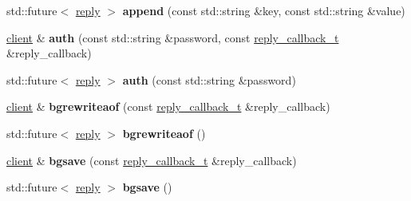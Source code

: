 \begin{DoxyCompactItemize}
\item 
\mbox{\label{classcpp__redis_1_1client_a3e50dddad0b4c9eca58d970bdc4e78da}} 
std\+::future$<$ \mbox{\hyperlink{classcpp__redis_1_1reply}{reply}} $>$ {\bfseries append} (const std\+::string \&key, const std\+::string \&value)
\item 
\mbox{\label{classcpp__redis_1_1client_a3ee834ca9c0810d2eafcf04de9dc0670}} 
\mbox{\hyperlink{classcpp__redis_1_1client}{client}} \& {\bfseries auth} (const std\+::string \&password, const \mbox{\hyperlink{classcpp__redis_1_1client_af7a65eb21aa25230bfbb0b0203c4fc04}{reply\+\_\+callback\+\_\+t}} \&reply\+\_\+callback)
\item 
\mbox{\label{classcpp__redis_1_1client_a899b98d4d6da0ffdf8780933fe088fd1}} 
std\+::future$<$ \mbox{\hyperlink{classcpp__redis_1_1reply}{reply}} $>$ {\bfseries auth} (const std\+::string \&password)
\item 
\mbox{\label{classcpp__redis_1_1client_a9873619c2c1ff820fde17e27ade096c8}} 
\mbox{\hyperlink{classcpp__redis_1_1client}{client}} \& {\bfseries bgrewriteaof} (const \mbox{\hyperlink{classcpp__redis_1_1client_af7a65eb21aa25230bfbb0b0203c4fc04}{reply\+\_\+callback\+\_\+t}} \&reply\+\_\+callback)
\item 
\mbox{\label{classcpp__redis_1_1client_a82959607f4cbe9dac195d27621a9cc64}} 
std\+::future$<$ \mbox{\hyperlink{classcpp__redis_1_1reply}{reply}} $>$ {\bfseries bgrewriteaof} ()
\item 
\mbox{\label{classcpp__redis_1_1client_a102a4f3572072a5bc26681082ad16a2b}} 
\mbox{\hyperlink{classcpp__redis_1_1client}{client}} \& {\bfseries bgsave} (const \mbox{\hyperlink{classcpp__redis_1_1client_af7a65eb21aa25230bfbb0b0203c4fc04}{reply\+\_\+callback\+\_\+t}} \&reply\+\_\+callback)
\item 
\mbox{\label{classcpp__redis_1_1client_a632ef40c52f46eb4948768006adfead5}} 
std\+::future$<$ \mbox{\hyperlink{classcpp__redis_1_1reply}{reply}} $>$ {\bfseries bgsave} ()
\item 
\mbox{\label{classcpp__redis_1_1client_aa6c9c15d8676a1cee3d8409ab898a049}} 

\end{DoxyCompactItemize}
